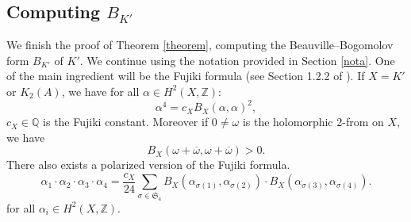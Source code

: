 \documentclass{alggeom}
\newcommand{\Z}{\mathbb{Z}}
\theoremstyle{plain}
\theoremstyle{definition}
\theoremstyle{remark}
\begin{document}
\subsection{Computing $B_{K'}$}\label{beauK'}
We finish the proof of Theorem \ref{theorem}, computing the Beauville--Bogomolov form $B_{K'}$ of $K'$. We continue using the notation provided in Section \ref{nota}. 
One of the main ingredient will be the Fujiki formula (see Section 1.2.2 of \cite{Lol}).
If $X=K'$ or $K_2(A)$, we have for all $\alpha\in H^2(X,\Z)$:
\begin{equation}
\alpha^{4}=c_{X}B_{X}(\alpha,\alpha)^2,
\label{Fujiki}
\end{equation}
$c_X\in \mathbb{Q}$ is the Fujiki constant. 
Moreover if 
$0\neq \omega$ is the holomorphic 2-from on $X$, we have 
\begin{equation}
B_{X}(\omega+\overline{\omega},\omega+\overline{\omega})>0.
\label{Fujikiposi}
\end{equation}
There also exists a polarized version of the Fujiki formula.
\begin{equation}
\alpha_{1}\cdot \alpha_{2}\cdot\alpha_{3}\cdot\alpha_{4}=\frac{c_{X}}{24}\sum_{\sigma\in \mathfrak{S}_{4}}B_{X}(\alpha_{\sigma(1)},\alpha_{\sigma(2)})\cdot B_{X}(\alpha_{\sigma(3)},\alpha_{\sigma(4)}).
\label{beauville}
\end{equation}
for all $\alpha_{i}\in H^{2}(X,\Z)$.
\end{document}

